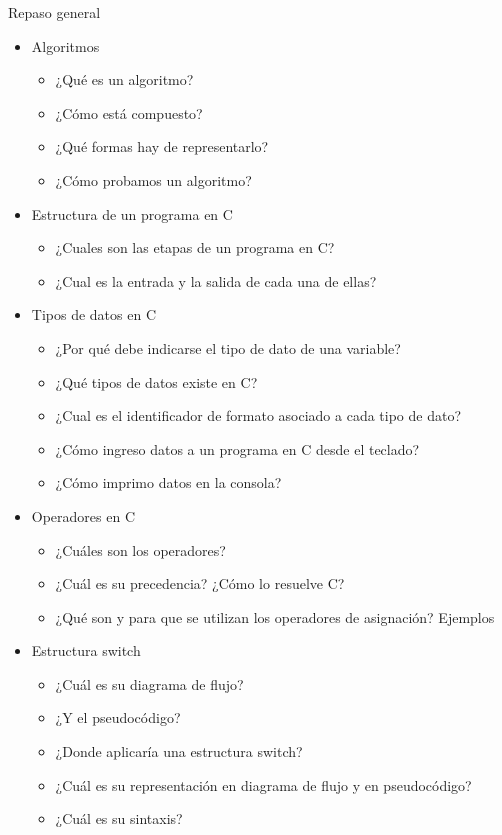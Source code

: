 \documentclass[xcolor=pdftex,table,11pt]{beamer}
\begin{document}
\begin{frame}[allowframebreaks]{Repaso general}
	\begin{itemize}
	\item Algoritmos
		\begin{itemize}
		\item  ¿Qué es un algoritmo?
		\item  ¿Cómo está compuesto?
		\item  ¿Qué formas hay de representarlo?
		\item  ¿Cómo probamos un algoritmo?
		\end{itemize}
		
	  \item Estructura de un programa en C
		\begin{itemize}
		\item  ¿Cuales son las etapas de un programa en C?
		\item  ¿Cual es la entrada y la salida de cada una de ellas?
		\end{itemize}
		
	\item Tipos de datos en C
		\begin{itemize}
		\item  ¿Por qué debe indicarse el tipo de dato de una variable?
		\item  ¿Qué tipos de datos existe en C?
		\item  ¿Cual es el identificador de formato asociado a cada tipo de dato?
		\item  ¿Cómo ingreso datos a un programa en C desde el teclado?
		\item  ¿Cómo imprimo datos en la consola?
		\end{itemize}
		\newpage
		\item Operadores en C
		\begin{itemize}
		\item  ¿Cuáles son los operadores?
		\item  ¿Cuál es su precedencia? ¿Cómo lo resuelve C?
		\item  ¿Qué son y para que se utilizan los operadores de asignación? Ejemplos
		\end{itemize}
		
		\item Estructura switch
		\begin{itemize}
		\item  ¿Cuál es su diagrama de flujo?
		\item  ¿Y el pseudocódigo? 
		\item  ¿Donde aplicaría una estructura switch?
		\item ¿Cuál es su representación en diagrama de flujo y en pseudocódigo?
		\item  ¿Cuál es su sintaxis?
		

\end{itemize}
\end{itemize}
\end{frame}
\end{document}
